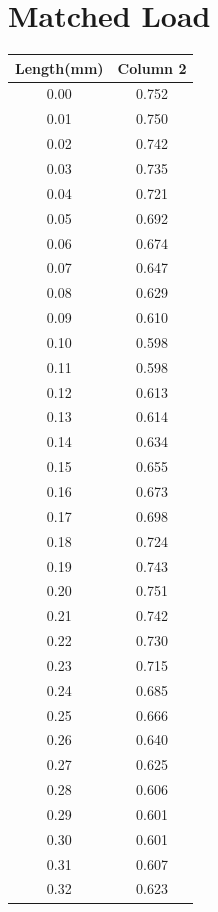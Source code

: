 \documentclass{report}
\begin{document}
    \section{Matched Load}
    \begin{multicols}{2}
    \begin{table}[H]
        \centering
        \begin{tabular}{cc}
        \hline
        Length(mm) & Column 2 \\
        \hline
        0.00 & 0.752 \\
        0.01 & 0.750 \\
        0.02 & 0.742 \\
        0.03 & 0.735 \\
        0.04 & 0.721 \\
        0.05 & 0.692 \\
        0.06 & 0.674 \\
        0.07 & 0.647 \\
        0.08 & 0.629 \\
        0.09 & 0.610 \\
        0.10 & 0.598 \\
        0.11 & 0.598 \\
        0.12 & 0.613 \\
        0.13 & 0.614 \\
        0.14 & 0.634 \\
        0.15 & 0.655 \\
        0.16 & 0.673 \\
        0.17 & 0.698 \\
        0.18 & 0.724 \\
        0.19 & 0.743 \\
        0.20 & 0.751 \\
        0.21 & 0.742 \\
        0.22 & 0.730 \\
        0.23 & 0.715 \\
        0.24 & 0.685 \\
        0.25 & 0.666 \\
        0.26 & 0.640 \\
        0.27 & 0.625 \\
        0.28 & 0.606 \\
        0.29 & 0.601 \\
        0.30 & 0.601 \\
        0.31 & 0.607 \\
        0.32 & 0.623 \\

\end{tabular}
\end{table}
\end{multicols}
\end{document}
